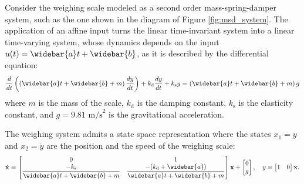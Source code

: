 Consider the weighing scale modeled as a second order mass-spring-damper system, such as the one shown in the diagram of Figure \ref{fig:msd_system}.
The application of an affine input turns the linear time-invariant system into a linear time-varying system, whose
dynamics depends on the input $u(t) = \widebar{a} t + \widebar{b}$, as it is described by the differential equation:
\begin{equation} \dfrac{d}{dt} \left( \left( \widebar{a} t + \widebar{b} + m \right) \dfrac{dy}{dt} \right) + k_{\mathrm{d}} \dfrac{dy}{dt} + k_{\mathrm{s}} y = \left( \widebar{a} t + \widebar{b} + m \right) g \end{equation}
where $m$ is the mass of the scale, $k_{\mathrm{d}}$ is the damping constant, $k_{\mathrm{s}}$ is the elasticity constant, and $g = 9.81$ $\mathrm{m/s}^2$ is the gravitational acceleration. 

The weighing system admits a state space representation where the states $x_1=y$ and $x_2=\dot{y}$ are the position and the speed of the weighing scale: 
\[ \dot{\mathbf{x}} = \begin{bmatrix} 0 & 1 \\ \dfrac{-k_{\mathrm{s}}}{\widebar{a} t + \widebar{b} + m} & \dfrac{-(k_{\mathrm{d}} + \widebar{a})}{\widebar{a} t + \widebar{b} + m} \end{bmatrix} \mathbf{x} + \begin{bmatrix} 0 \\ g \end{bmatrix},  \quad y = \begin{bmatrix} 1 & 0  \end{bmatrix} \mathbf{x} . \]


